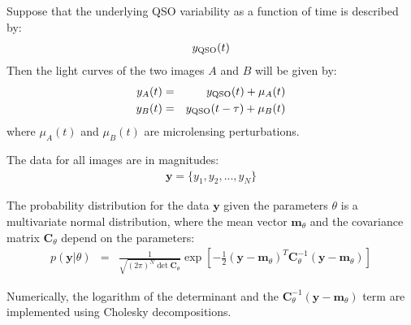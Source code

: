 \documentclass[a4paper, 11pt]{article}
\title{}
\author{}
\date{} %
\newcommand{\yy}{\mathbf{y}}
\newcommand{\mm}{\mathbf{m}_\theta}
\newcommand{\CC}{\mathbf{C}_\theta}
\begin{document}
Suppose that the underlying QSO variability as a function of time is
described by:
\begin{eqnarray}
y_{\rm QSO}(t)
\end{eqnarray}
Then the light curves of the two images $A$ and $B$ will be given by:
\begin{eqnarray}
y_A(t) &=& y_{\rm QSO}(t) + \mu_A(t)\\
y_B(t) &=& y_{\rm QSO}(t - \tau) + \mu_B(t)
\end{eqnarray}
where $\mu_A(t)$ and $\mu_B(t)$ are microlensing perturbations.



The data for all images are in magnitudes:
\begin{eqnarray}
\yy = \{y_1, y_2, ..., y_N\}
\end{eqnarray}


The probability distribution for the data $\yy$ given the parameters
$\theta$
is a multivariate normal distribution, where the mean vector $\mm$
and the covariance matrix $\CC$ depend on the parameters:
\begin{eqnarray}
p(\yy | \theta) &=& \frac{1}{\sqrt{(2\pi)^N\det{\CC}}}
\exp\left[
-\frac{1}{2}
\left(
\yy - \mm
\right)^T
\CC^{-1}
\left(
\yy - \mm
\right)
\right]
\end{eqnarray}

Numerically, the logarithm of the determinant and the
$\CC^{-1}\left(\yy - \mm\right)$ term are implemented using
Cholesky decompositions.
\end{document}
